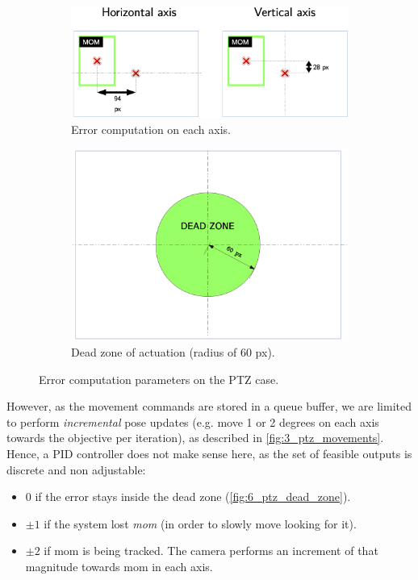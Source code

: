 	\begin{figure}[h]
		\centering
		\begin{subfigure}[b]{0.6\linewidth}
			\centering
			\includegraphics[width=4in]{images/ptz_error_comp}
			\caption{Error computation on each axis.}
			\label{fig:6_ptz_error}
		\end{subfigure}
		\hfill
		\begin{subfigure}[b]{0.5\linewidth}
			\centering
			\includegraphics[width=4in]{images/ptz_dead_zone}
			\caption{Dead zone of actuation (radius of 60 px).}
			\label{fig:6_ptz_dead_zone}
		\end{subfigure}
		\caption{Error computation parameters on the PTZ case.}
		\label{fig:6_ptz_parameters}
	\end{figure}
	
	However, as the movement commands are stored in a queue buffer, we are limited to perform \emph{incremental} pose updates (e.g. move 1 or 2 degrees on each axis towards the objective per iteration), as described in \autoref{fig:3_ptz_movements}. Hence, a PID controller does not make sense here, as the set of feasible outputs is discrete and non adjustable:
	\begin{itemize}
		\item $0$ if the error stays inside the dead zone (\autoref{fig:6_ptz_dead_zone}).
		
		\item $\pm 1$ if the system lost \emph{mom} (in order to slowly move looking for it).
		
		\item $\pm 2$ if mom is being tracked. The camera performs an increment of that magnitude towards mom in each axis.
	\end{itemize}
	

